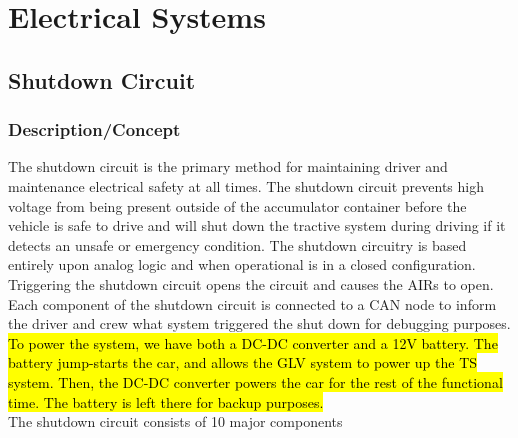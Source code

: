 \documentclass{article}
\DeclareRobustCommand{\hlr}[1]{{\sethlcolor{red}\hl{#1}}}
\begin{document}
\newpage

\section{Electrical Systems}

    \subsection{Shutdown Circuit}
    
        \subsubsection{Description/Concept}
        
            The shutdown circuit is the primary method for maintaining driver and maintenance electrical safety at all times. The shutdown circuit prevents high voltage from being present outside of the accumulator container before the vehicle is safe to drive and will shut down the tractive system during driving if it detects an unsafe or emergency condition. The shutdown circuitry is based entirely upon analog logic and when operational is in a closed configuration. Triggering the shutdown circuit opens the circuit and causes the AIRs to open. Each component of the shutdown circuit is connected to a CAN node to inform the driver and crew what system triggered the shut down for debugging purposes. \hlr{To power the system, we have both a DC-DC converter and a 12V battery. The battery jump-starts the car, and allows the GLV system to power up the TS system. Then, the DC-DC converter powers the car for the rest of the functional time. The battery is left there for backup purposes. }\\
            
            The shutdown circuit consists of 10 major components
            
\end{document}
